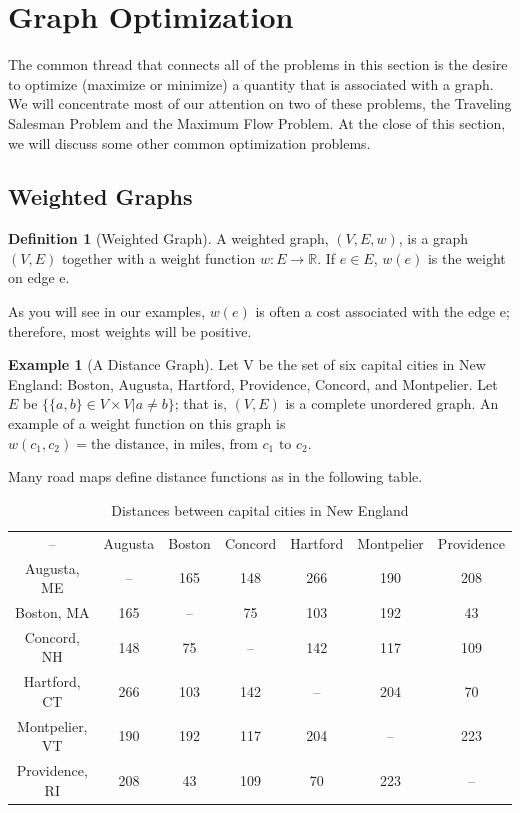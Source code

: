 \documentclass[10pt,]{book}
\theoremstyle{plain}
\theoremstyle{definition}
\newtheorem{definition}[theorem]{Definition}
\theoremstyle{definition}
\theoremstyle{definition}
\newtheorem{example}[theorem]{Example}
\theoremstyle{definition}
\theoremstyle{definition}
\numberwithin{equation}{section}
\newcommand{\hrulethick} {\noalign{\hrule height 0.11em}}
\begin{document}
\section[Graph Optimization]{Graph Optimization}\label{s-graph-optimization}
\typeout{************************************************}
\typeout{************************************************}
The common thread that connects all of the problems in this section is the desire to optimize (maximize or minimize) a quantity that is associated with a graph. We will concentrate most of our attention on two of these problems, the Traveling Salesman Problem and the Maximum Flow Problem. At the close of this section, we will discuss some other common optimization problems.%
\typeout{************************************************}
\typeout{************************************************}
\subsection[Weighted Graphs]{Weighted Graphs}\label{ss-weighted-graph}
\begin{definition}[Weighted Graph]\label{def-weighted-graph}
A weighted graph, \((V, E, w)\), is a graph \((V, E)\) together with a weight function \(w: E \to \mathbb{R}\).
If \(e \in  E\), \(w(e)\) is the weight on edge e.%
\end{definition}
As you will see in our examples, \(w(e)\) is often a cost associated with the edge e; therefore, most weights will be positive.%
\begin{example}[A Distance Graph]\label{ex-distance-graph}
Let V be the set of six capital cities in New England: Boston, Augusta, Hartford, Providence, Concord, and Montpelier. Let \(E\) be \(\{\{a, b\} \in  V \times V| a\neq  b\}\); that is, \((V,E)\) is a complete unordered graph. An example of a weight function on this graph is \(w\left(c_1, c _2\right) = \textrm{the distance, in miles, from } c_1 \textrm{ to } c_2\). %
\par
Many road maps define distance functions as in the following table.%
\leavevmode%
\begin{table}
\centering
\begin{tabular}{ccccccc}\hrulethick
--&Augusta&Boston&Concord&Hartford&Montpelier&Providence\tabularnewline[0pt]
Augusta, ME&--&165&148&266&190&208\tabularnewline[0pt]
Boston, MA&165&--&75&103&192&43\tabularnewline[0pt]
Concord, NH&148&75&--&142&117&109\tabularnewline[0pt]
Hartford, CT&266&103&142&--&204&70\tabularnewline[0pt]
Montpelier, VT&190&192&117&204&--&223\tabularnewline[0pt]
Providence, RI&208&43&109&70&223&--
\end{tabular}
\caption{Distances between capital cities in New England\label{table-ne-capitals}}
\end{table}
\end{example}
\typeout{************************************************}
\typeout{************************************************}
\end{document}
